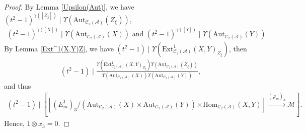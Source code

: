 \documentclass[12pt]{amsart}
\theoremstyle{definition}
\numberwithin{equation}{section}
\begin{document}
\begin{proof}
         By Lemma \ref{Upsilon(Aut)}, we have $ (t^2-1)^{\gamma([Z_{\xi}])} \mid \Upsilon(\mathrm{Aut}_{\mathcal{C}_2(\mathcal{A})}(Z_{\xi})) $, 
    \begin{align*}
        (t^2-1)^{\gamma([X])} \mid \Upsilon(\mathrm{Aut}_{\mathcal{C}_2(\mathcal{A})}(X)) \text{ and } (t^2-1)^{\gamma([Y])} \mid \Upsilon(\mathrm{Aut}_{\mathcal{C}_2(\mathcal{A})}(Y)).
    \end{align*}
    By Lemma \ref{Ext^1(X,Y)Z}, we have $ (t^2-1) \mid \Upsilon(\mathrm{Ext}^1_{\mathcal{C}_2(\mathcal{A})}(X,Y)_{Z_{\xi}}) $, then
    \begin{align*}
        (t^2-1) \mid \frac{\Upsilon(\mathrm{Ext}^1_{\mathcal{C}_2(\mathcal{A})}(X,Y)_{Z_{\xi}})\Upsilon(\mathrm{Aut}_{\mathcal{C}_2(\mathcal{A})}(Z_{\xi}))}{\Upsilon(\mathrm{Aut}_{\mathcal{C}_2(\mathcal{A})}(X))\Upsilon(\mathrm{Aut}_{\mathcal{C}_2(\mathcal{A})}(Y))}, 
    \end{align*}
    and thus
    \begin{align*}
         (t^2-1) \mid [[(E_m^1)_3/(\mathrm{Aut}_{\mathcal{C}_2(\mathcal{A})}(X) \times \mathrm{Aut}_{\mathcal{C}_2(\mathcal{A})}(Y)) \ltimes \mathrm{Hom}_{\mathcal{C}_2(\mathcal{A})}(X,Y)] \xrightarrow{(\varphi_m)_3} \mathcal{M}].
    \end{align*}
    Hence, $ 1 \otimes x_3 =0 $.
\end{proof}
\end{document}
